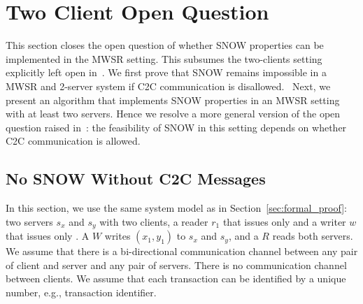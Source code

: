 \section{Two Client Open Question}
\label{sec:2c2s}
This section closes the open question of whether SNOW properties can be implemented in the MWSR setting. This subsumes the two-clients setting explicitly left open in~\cite{SNOW2016}. We first prove that SNOW remains impossible in a 
MWSR and 2-server system if C2C communication is disallowed. 
Next, we present an algorithm that implements SNOW properties in an MWSR setting with at least two servers. Hence we resolve a more general version of the open question raised in~\cite{SNOW2016}: the feasibility of SNOW in this setting depends on whether C2C communication is allowed.
 
 \subsection{No  SNOW Without C2C  Messages}
 \label{subsec:no_snow_no_c2c}
 In this section, we use the same system model as in Section~\ref{sec:formal_proof}: two servers $s_x$ and $s_y$ with two clients, a reader $r_1$ that issues only 
\rots{} and a writer $w$ that issues only \wots{}. A \wot{} $W$ writes $(x_1, y_1)$ to $s_x$ and $s_y$, and a \rot{} $R$ reads both servers. We assume that there is a bi-directional communication channel between any pair of client and server and any pair of servers. There is no communication channel between clients. We assume that each transaction can be identified by a unique number, e.g., transaction identifier. 

